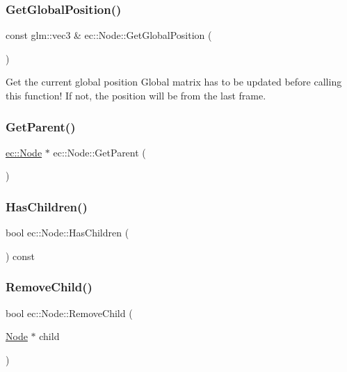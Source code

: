 \subsubsection{\texorpdfstring{Get\+Global\+Position()}{GetGlobalPosition()}}
{\footnotesize\ttfamily const glm\+::vec3 \& ec\+::\+Node\+::\+Get\+Global\+Position (\begin{DoxyParamCaption}{ }\end{DoxyParamCaption})}

Get the current global position Global matrix has to be updated before calling this function! If not, the position will be from the last frame. \mbox{\label{classec_1_1_node_a88919835b03a7055f4c1c50c68b83fac}} 
\subsubsection{\texorpdfstring{Get\+Parent()}{GetParent()}}
{\footnotesize\ttfamily \mbox{\hyperlink{classec_1_1_node}{ec\+::\+Node}} $\ast$ ec\+::\+Node\+::\+Get\+Parent (\begin{DoxyParamCaption}{ }\end{DoxyParamCaption})}

\mbox{\label{classec_1_1_node_add6f4b234aebaeb7d1e76d42234b9831}} 
\subsubsection{\texorpdfstring{Has\+Children()}{HasChildren()}}
{\footnotesize\ttfamily bool ec\+::\+Node\+::\+Has\+Children (\begin{DoxyParamCaption}{ }\end{DoxyParamCaption}) const}

\mbox{\label{classec_1_1_node_a65f938c730afc4f5b4fcceb64ac84416}} 
\subsubsection{\texorpdfstring{Remove\+Child()}{RemoveChild()}}
{\footnotesize\ttfamily bool ec\+::\+Node\+::\+Remove\+Child (\begin{DoxyParamCaption}\item[{\mbox{\hyperlink{classec_1_1_node}{Node}} $\ast$}]{child }\end{DoxyParamCaption})}

